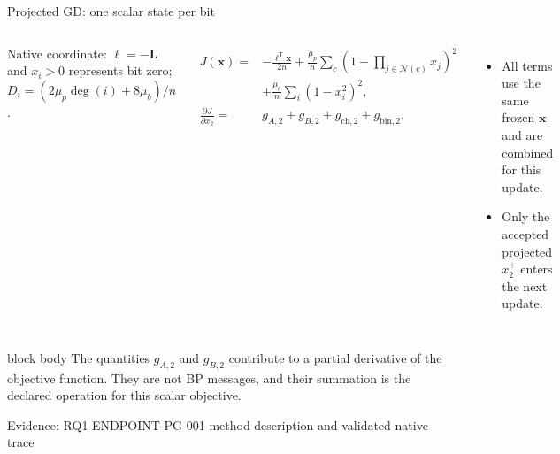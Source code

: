 \documentclass[aspectratio=169,9pt,t]{beamer}
\newcommand{\evidence}[1]{%
  \vfill\hfill{\fontsize{5.8}{6.8}\selectfont\color{Muted}Evidence: #1}}
\begin{document}
\begin{frame}{Projected GD: one scalar state per bit}
  \begin{columns}[T,onlytextwidth]
    \centering

    \small
    {\scriptsize\color{Muted}Native coordinate: $\boldsymbol\ell=-\mathbf L$ and
      $x_i>0$ represents bit zero; $D_i=(2\mu_p\deg(i)+8\mu_b)/n$.}\par\vspace{-1mm}
    \begin{align*}
      J(\mathbf{x})={}&-\frac{\boldsymbol\ell^{\mathsf T}\mathbf{x}}{2n}
      +\frac{\mu_p}{n}\sum_c\left(1-\prod_{j\in\mathcal N(c)}x_j\right)^2\\
      &+\frac{\mu_b}{n}\sum_i(1-x_i^2)^2,\\[1mm]
      \frac{\partial J}{\partial x_2}={}&g_{A,2}+g_{B,2}
        +g_{\mathrm{ch},2}+g_{\mathrm{bin},2}.
    \end{align*}
    \begin{itemize}
      \item All terms use the same frozen $\mathbf{x}$ and are combined for this update.
      \item Only the accepted projected $x_2^+$ enters the next update.
    \end{itemize}
  \end{columns}

  \begin{beamercolorbox}[rounded=true,sep=.8ex]{block body}
    \footnotesize The quantities $g_{A,2}$ and $g_{B,2}$ contribute to a partial derivative of the objective function. They are not BP messages, and their summation is the declared operation for this scalar objective.
  \end{beamercolorbox}
  \evidence{RQ1-ENDPOINT-PG-001 method description and validated native trace}
\end{frame}
\end{document}
